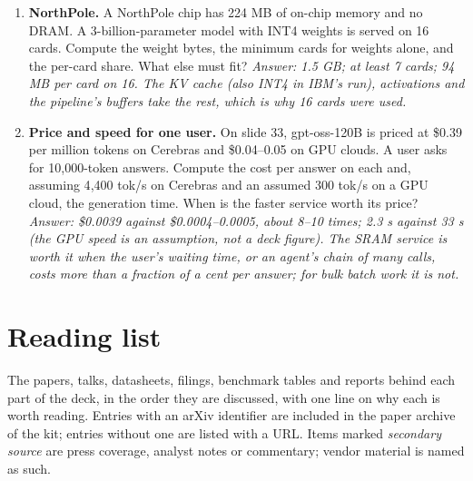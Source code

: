 \documentclass[11pt,letterpaper]{article}
\newcommand{\setstage}[1]{\colorlet{stagec}{#1}}
\begin{document}
\begin{enumerate}[leftmargin=1.6em,itemsep=6pt]
\item \textbf{NorthPole.} A NorthPole chip has 224 MB of on-chip memory and no DRAM. A 3-billion-parameter model with INT4 weights is served on 16 cards. Compute the weight bytes, the minimum cards for weights alone, and the per-card share. What else must fit? \emph{Answer: 1.5 GB; at least 7 cards; 94 MB per card on 16. The KV cache (also INT4 in IBM's run), activations and the pipeline's buffers take the rest, which is why 16 cards were used.}
\item \textbf{Price and speed for one user.} On slide 33, gpt-oss-120B is priced at \$0.39 per million tokens on Cerebras and \$0.04--0.05 on GPU clouds. A user asks for 10{,}000-token answers. Compute the cost per answer on each and, assuming 4{,}400 tok/s on Cerebras and an assumed 300 tok/s on a GPU cloud, the generation time. When is the faster service worth its price? \emph{Answer: \$0.0039 against \$0.0004--0.0005, about 8--10 times; 2.3 s against 33 s (the GPU speed is an assumption, not a deck figure). The SRAM service is worth it when the user's waiting time, or an agent's chain of many calls, costs more than a fraction of a cent per answer; for bulk batch work it is not.}
\end{enumerate}
\clearpage
\setstage{ink}
\section{Reading list}
\label{app:reading}
The papers, talks, datasheets, filings, benchmark tables and reports behind each part of the deck, in the order they are discussed, with one line on why each is worth reading. Entries with an arXiv identifier are included in the paper archive of the kit; entries without one are listed with a URL. Items marked \emph{secondary source} are press coverage, analyst notes or commentary; vendor material is named as such.
\end{document}
